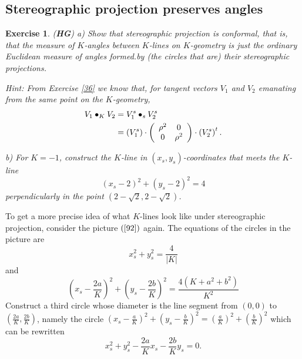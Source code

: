 \documentclass{article}%
\newtheorem{exercise}[theorem]{Exercise}
\begin{document}
\subsection{Stereographic projection preserves angles}

\begin{exercise}
(\textbf{HG}) a) Show that stereographic projection is conformal, that is,
that the measure of $K$-angles between $K$-lines on $K$-geometry is just the
ordinary Euclidean measure of angles formed.by (the circles that are) their
stereographic projections.

Hint: From Exercise \ref{36} we know that, for tangent vectors $V_{1}$ and
$V_{2}$ emanating from the same point on the $K$-geometry,
\begin{align*}
V_{1}\bullet_{K}V_{2}  &  =V_{1}^{s}\bullet_{s}V_{2}^{s}\\
&  =\left(  V_{1}^{s}\right)  \cdot\left(
\begin{array}
[c]{cc}%
\rho^{2} & 0\\
0 & \rho^{2}%
\end{array}
\right)  \cdot\left(  V_{2}^{s}\right)  ^{t}.
\end{align*}


b) For $K=-1$, construct the $K$-line in $\left(  x_{s},y_{s}\right)
$-coordinates that meets the $K$-line
\[
\left(  x_{s}-2\right)  ^{2}+\left(  y_{s}-2\right)  ^{2}=4
\]
perpendicularly in the point $\left(  2-\sqrt{2},2-\sqrt{2}\right)  $.
\end{exercise}

To get a more precise idea of what $K$-lines look like under stereographic
projection, consider the picture $\left(  \ref{92}\right)  $ again. The
equations of the circles in the picture are%
\begin{equation}
x_{s}^{2}+y_{s}^{2}=\frac{4}{\left\vert K\right\vert } \label{93}%
\end{equation}
and%
\begin{equation}
\left(  x_{s}-\frac{2a}{K}\right)  ^{2}+\left(  y_{s}-\frac{2b}{K}\right)
^{2}=\frac{4\left(  K+a^{2}+b^{2}\right)  }{K^{2}} \label{94}%
\end{equation}
Construct a third circle whose diameter is the line segment from $\left(
0,0\right)  $ to $\left(  \frac{2a}{K},\frac{2b}{K}\right)  $, namely the
circle $\left(  x_{s}-\frac{a}{K}\right)  ^{2}+\left(  y_{s}-\frac{b}%
{K}\right)  ^{2}=\left(  \frac{a}{K}\right)  ^{2}+\left(  \frac{b}{K}\right)
^{2}$ which can be rewritten%
\begin{equation}
x_{s}^{2}+y_{s}^{2}-\frac{2a}{K}x_{s}-\frac{2b}{K}y_{s}=0. \label{95}%
\end{equation}
\end{document}
